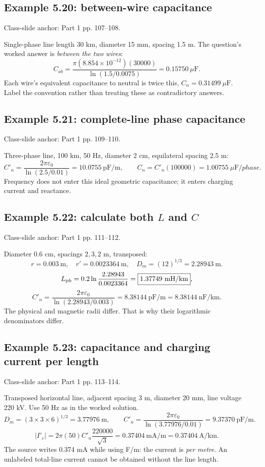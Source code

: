 \documentclass[11pt,a4paper]{article}
\newcommand{\slides}[1]{{\small\color{muted}\textsf{Class-slide anchor: #1.}}\par}
\newcommand{\ans}[1]{\boxed{#1}}
\begin{document}
\subsection{Example 5.20: between-wire capacitance}
\slides{Part 1 pp. 107--108}
Single-phase line length 30 km, diameter 15 mm, spacing 1.5 m. The question's worked answer is \emph{between the two wires}:
\[
 C_{ab}=\frac{\pi(8.854\times10^{-12})(30000)}{\ln(1.5/0.0075)}
 =\ans{0.15750\ \mu\mathrm F}.
\]
Each wire's equivalent capacitance to neutral is twice this, $\ans{C_n=0.31499\ \mu\mathrm F}$. Label the convention rather than treating these as contradictory answers.
\subsection{Example 5.21: complete-line phase capacitance}
\slides{Part 1 pp. 109--110}
Three-phase line, 100 km, 50 Hz, diameter 2 cm, equilateral spacing 2.5 m:
\[
 C'_n=\frac{2\pi\varepsilon_0}{\ln(2.5/0.01)}
 =10.0755\ \mathrm{pF/m},\qquad
 C_n=C'_n(100000)=\ans{1.00755\ \mu\mathrm F/phase}.
\]
Frequency does not enter this ideal geometric capacitance; it enters charging current and reactance.
\subsection{Example 5.22: calculate both \texorpdfstring{$L$ and $C$}{L and C}}
\slides{Part 1 pp. 111--112}
Diameter 0.6 cm, spacings $2,3,2$ m, transposed:
\[
 r=0.003\ \mathrm m,\quad r'=0.0023364\ \mathrm m,\quad D_m=(12)^{1/3}=2.28943\ \mathrm m.
\]
\[
 L_{\rm ph}=0.2\ln\frac{2.28943}{0.0023364}
 =\ans{1.37749\ \mathrm{mH/km}},
\]
\[
 C'_n=\frac{2\pi\varepsilon_0}{\ln(2.28943/0.003)}
 =\ans{8.38144\ \mathrm{pF/m}=8.38144\ \mathrm{nF/km}}.
\]
The physical and magnetic radii differ. That is why their logarithmic denominators differ.
\subsection{Example 5.23: capacitance and charging current per length}
\slides{Part 1 pp. 113--114}
Transposed horizontal line, adjacent spacing 3 m, diameter 20 mm, line voltage 220 kV. Use 50 Hz as in the worked solution.
\[
 D_m=(3\times3\times6)^{1/3}=3.77976\ \mathrm m,
 \qquad C'_n=\frac{2\pi\varepsilon_0}{\ln(3.77976/0.01)}
 =9.37370\ \mathrm{pF/m}.
\]
\[
 |I'_c|=2\pi(50)C'_n\frac{220000}{\sqrt3}
 =\ans{0.37404\ \mathrm{mA/m}=0.37404\ \mathrm{A/km}}.
\]
The source writes 0.374 mA while using F/m: the current is \emph{per metre}. An unlabeled total-line current cannot be obtained without the line length.
\end{document}
